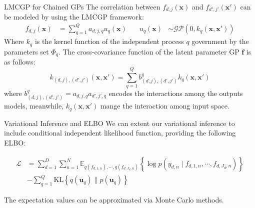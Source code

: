 \begin{frame}{LMCGP for Chained GPs}
	The correlation between \(f_{d,j}(\mathbf{x})\) and \(f_{d',j'}(\mathbf{x}')\) can be modeled by using the LMCGP framework:
	\begin{equation*}
		\begin{aligned}
			f_{d,j}(\mathbf{x}) &= \sum_{q=1}^Q a_{d,j,q} u_{q}(\mathbf{x}) \quad &
			u_{q}(\mathbf{x}) &\sim \mathcal{GP}(0, k_{q}(\mathbf{x}, \mathbf{x}')) 
		\end{aligned}\label{eq:chd_cov}
	\end{equation*}
	Where $k_q$ is the kernel function of the independent process $q$ government by the parameters set $\Phi_q$. The cross-covariance function of the latent parameter GP $\mathbf{f}$ is as follows:
	\begin{equation*}
			k_{(d,j), (d',j')}(\mathbf{x}, \mathbf{x}') =\sum_{q=1}^Q b^q_{(d,j), (d',j')} k_{q}(\mathbf{x}, \mathbf{x}')
	\end{equation*}
	where $b^q_{(d,j), (d',j')} = a_{d,j,q}a_{d',j',q}$ encodes the interactions among the outputs models, meanwhile, $k_{q}(\mathbf{x}, \mathbf{x}')$ mange the interaction among input space.
\end{frame}

\begin{frame}{Variational Inference and ELBO}
	We can extent our variational inference to include conditional independent likelihood function, providing the following ELBO:
	
\begin{equation*}
	\begin{split}
	\mathcal{L} &= \sum_{d=1}^D \sum_{n=1}^{N} \mathbb{E}_{q(f_{d,1,n}), \cdots, q(f_{d,J_d,n})} 
	\left\{ \log p\left( y_{d,n} \mid f_{d,1,n}, \cdots, f_{d,J_d,n} \right) \right\} \\
	&- \sum_{q=1}^Q \text{KL}\left\{ q(\mathbf{u}_q) \parallel p(\mathbf{u}_q) \right\}
	\end{split}
\end{equation*}

The expectation values can be approximated via Monte Carlo methods.
	
\end{frame}

